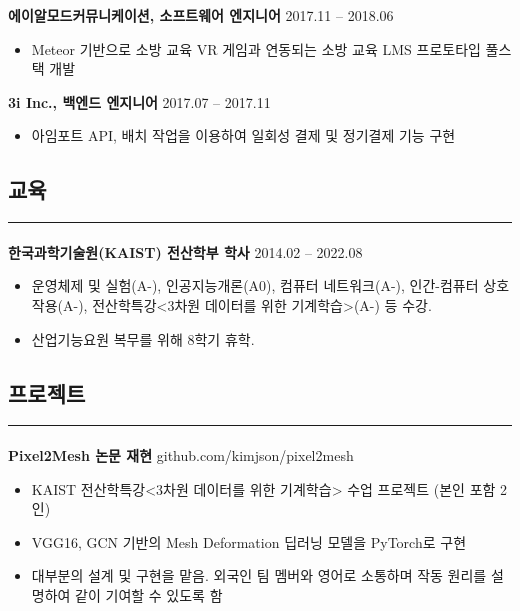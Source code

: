 \documentclass{article}
\begin{document}
\textbf{에이알모드커뮤니케이션, 소프트웨어 엔지니어} \hfill 2017.11 -- 2018.06
\begin{itemize}
    \setlength\itemsep{0.1em}
     \item Meteor 기반으로 소방 교육 VR 게임과 연동되는 소방 교육 LMS 프로토타입 풀스택 개발
\end{itemize}

\textbf{3i Inc., 백엔드 엔지니어} \hfill 2017.07 -- 2017.11
\begin{itemize}
    \setlength\itemsep{0.1em}
     \item 아임포트 API, 배치 작업을 이용하여 일회성 결제 및 정기결제 기능 구현
\end{itemize}

\begin{center}
    \section*{교육}
\end{center}
\hrule
\paragraph{\newline \newline}
\textbf{한국과학기술원(KAIST) 전산학부 학사} \hfill 2014.02 -- 2022.08
\begin{itemize}
    \setlength\itemsep{0.1em}
    \item 운영체제 및 실험(A-), 인공지능개론(A0), 컴퓨터 네트워크(A-), 인간-컴퓨터 상호작용(A-), 전산학특강<3차원 데이터를 위한 기계학습>(A-) 등 수강.
    \item 산업기능요원 복무를 위해 8학기 휴학.
\end{itemize}

\begin{center}
    \section*{프로젝트}
\end{center}
\hrule
\paragraph{\newline \newline}
\textbf{Pixel2Mesh 논문 재현} \hfill github.com/kimjson/pixel2mesh
\begin{itemize}
    \setlength\itemsep{0.1em}
    \item KAIST 전산학특강<3차원 데이터를 위한 기계학습> 수업 프로젝트 (본인 포함 2인)
    \item VGG16, GCN 기반의 Mesh Deformation 딥러닝 모델을 PyTorch로 구현
    \item 대부분의 설계 및 구현을 맡음. 외국인 팀 멤버와 영어로 소통하며 작동 원리를 설명하여 같이 기여할 수 있도록 함
\end{itemize}
\end{document}
